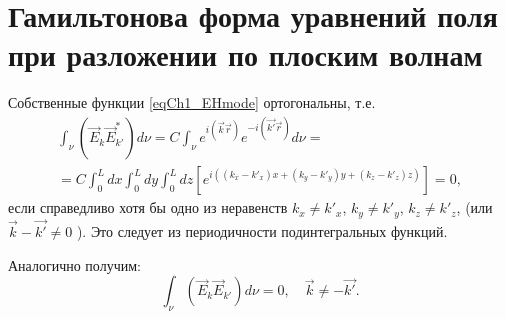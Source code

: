 \section{Гамильтонова форма уравнений поля при разложении по плоским
  волнам}
Собственные функции \eqref{eqCh1_EHmode} ортогональны, т.е.
\begin{eqnarray}
\int_{\nu} \left( \vec{E}_k \vec{E}_{k'}^{*} \right) d \nu =
C \int_{\nu} e^{i \left(\vec{k}\vec{r}\right)} e^{- i
  \left(\vec{k'}\vec{r}\right)} d \nu =
\nonumber \\
= C \int_0^L d x \int_0^L d y \int_0^L d z
\left[ e^{i\left(
\left(k_x - k'_x\right) x +
\left(k_y - k'_y\right) y +
\left(k_z - k'_z\right) z
\right)}
\right] = 0,
\end{eqnarray}
если справедливо хотя бы одно из неравенств 
$k_x \ne k'_x$,
$k_y \ne k'_y$,
$k_z \ne k'_z$,
(или 
$\vec{k} - \vec{k'} \ne 0$
).  Это следует из периодичности подинтегральных функций. 

Аналогично получим:
\begin{equation}
\int_{\nu} \left( \vec{E}_k \vec{E}_{k'} \right) d \nu = 0,
\quad
\vec{k} \ne - \vec{k'}.
\end{equation}

